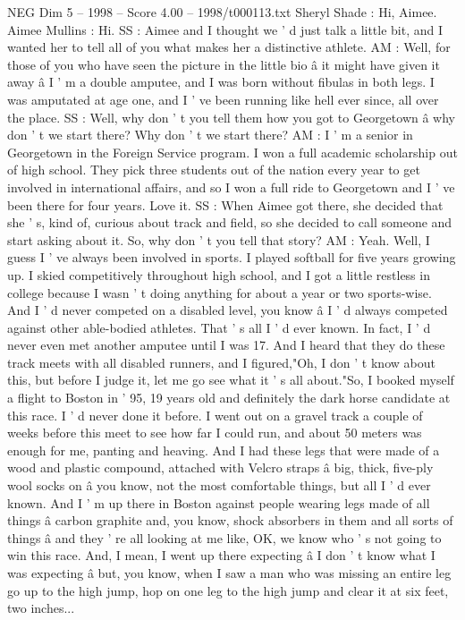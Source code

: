 \begin{textsample}{NEG Dim 5 – 1998 – Score 4.00 – 1998/t000113.txt}  \label{ex:f5_neg_072}
Sheryl Shade : Hi, Aimee.
Aimee Mullins : Hi.
SS : Aimee and I thought we ' d just talk a little bit, and I wanted her to tell all of you what makes her a distinctive athlete.
AM : Well, for those of you who have seen the picture in the little bio â it might have given it away â I ' m a double amputee, and I was born without fibulas in both legs.
I was amputated at age one, and I ' ve been running like hell ever since, all over the place.
SS : Well, why don ' t you tell them how you got to Georgetown â why don ' t we start there?
Why don ' t we start there?
AM : I ' m a senior in Georgetown in the Foreign Service program.
I won a full academic scholarship out of high school.
They pick three students out of the nation every year to get involved in international affairs, and so I won a full ride to Georgetown and I ' ve been there for four years.
Love it.
SS : When Aimee got there, she decided that she ' s, kind of, curious about track and field, so she decided to call someone and start asking about it.
So, why don ' t you tell that story?
AM : Yeah.
Well, I guess I ' ve always been involved in sports.
I played softball for five years growing up.
I skied competitively throughout high school, and I got a little restless in college because I wasn ' t doing anything for about a year or two sports-wise.
And I ' d never competed on a disabled level, you know â I ' d always competed against other able-bodied athletes.
That ' s all I ' d ever known.
In fact, I ' d never even met another amputee until I was 17.
And I heard that they do these track meets with all disabled runners, and I figured,"Oh, I don ' t know about this, but before I judge it, let me go see what it ' s all about."So, I booked myself a flight to Boston in ' 95, 19 years old and definitely the dark horse candidate at this race.
I ' d never done it before.
I went out on a gravel track a couple of weeks before this meet to see how far I could run, and about 50 meters was enough for me, panting and heaving.
And I had these legs that were made of a wood and plastic compound, attached with Velcro straps â big, thick, five-ply wool socks on â you know, not the most comfortable things, but all I ' d ever known.
And I ' m up there in Boston against people wearing legs made of all things â carbon graphite and, you know, shock absorbers in them and all sorts of things â and they ' re all looking at me like, OK, we know who ' s not going to win this race.
And, I mean, I went up there expecting â I don ' t know what I was expecting â but, you know, when I saw a man who was missing an entire leg go up to the high jump, hop on one leg to the high jump and clear it at six feet, two inches...

\end{textsample}
